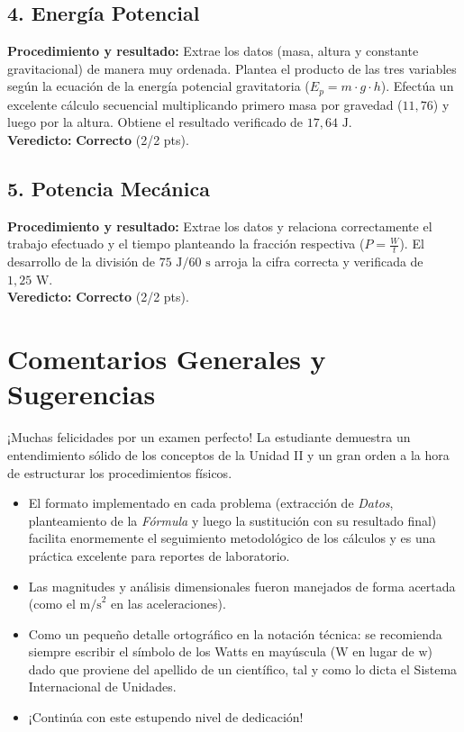 \documentclass[12pt,letterpaper]{article}
\begin{document}
\subsection*{4. Energía Potencial}
\textbf{Procedimiento y resultado:} Extrae los datos (masa, altura y constante gravitacional) de manera muy ordenada. Plantea el producto de las tres variables según la ecuación de la energía potencial gravitatoria ($E_p = m \cdot g \cdot h$). Efectúa un excelente cálculo secuencial multiplicando primero masa por gravedad ($11,76$) y luego por la altura. Obtiene el resultado verificado de $17,64 \text{ J}$. \\
\textbf{Veredicto:} \textbf{Correcto} (2/2 pts).

\subsection*{5. Potencia Mecánica}
\textbf{Procedimiento y resultado:} Extrae los datos y relaciona correctamente el trabajo efectuado y el tiempo planteando la fracción respectiva ($P = \frac{W}{t}$). El desarrollo de la división de $75 \text{ J} / 60 \text{ s}$ arroja la cifra correcta y verificada de $1,25 \text{ W}$. \\
\textbf{Veredicto:} \textbf{Correcto} (2/2 pts).

\vspace{0.5cm}
\section*{Comentarios Generales y Sugerencias}
¡Muchas felicidades por un examen perfecto! La estudiante demuestra un entendimiento sólido de los conceptos de la Unidad II y un gran orden a la hora de estructurar los procedimientos físicos.
\begin{itemize}
    \item El formato implementado en cada problema (extracción de \textit{Datos}, planteamiento de la \textit{Fórmula} y luego la sustitución con su resultado final) facilita enormemente el seguimiento metodológico de los cálculos y es una práctica excelente para reportes de laboratorio.
    \item Las magnitudes y análisis dimensionales fueron manejados de forma acertada (como el $\text{m/s}^2$ en las aceleraciones).
    \item Como un pequeño detalle ortográfico en la notación técnica: se recomienda siempre escribir el símbolo de los Watts en mayúscula ($\text{W}$ en lugar de $\text{w}$) dado que proviene del apellido de un científico, tal y como lo dicta el Sistema Internacional de Unidades.
    \item ¡Continúa con este estupendo nivel de dedicación!
\end{itemize}
\end{document}
